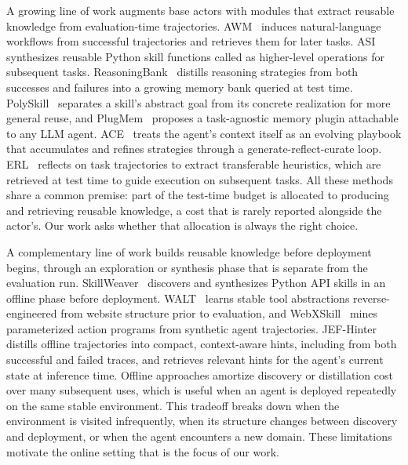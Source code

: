  A growing line of work augments base actors with modules that extract reusable knowledge from evaluation-time trajectories.
AWM~\citep{wang-etal-2024-agent} induces natural-language workflows from successful trajectories and retrieves them for later tasks.
ASI~\citep{wang-etal-2025-asi} synthesizes reusable Python skill functions called as higher-level operations for subsequent tasks.
ReasoningBank~\citep{ouyang-etal-2025-reasoningbank} distills reasoning strategies from both successes and failures into a growing memory bank queried at test time.
PolySkill~\citep{li-etal-2025-polyskill} separates a skill's abstract goal from its concrete realization for more general reuse, and PlugMem~\citep{yang-etal-2026-plugmem} proposes a task-agnostic memory plugin attachable to any LLM agent.
ACE~\citep{zhang-etal-2025-ace} treats the agent's context itself as an evolving playbook that accumulates and refines strategies through a generate-reflect-curate loop.
ERL~\citep{allard-etal-2026-erl} reflects on task trajectories to extract transferable heuristics, which are retrieved at test time to guide execution on subsequent tasks.
All these methods share a common premise: part of the test-time budget is allocated to producing and retrieving reusable knowledge, a cost that is rarely reported alongside the actor's.
Our work asks whether that allocation is always the right choice.

 A complementary line of work builds reusable knowledge before deployment begins, through an exploration or synthesis phase that is separate from the evaluation run.
SkillWeaver~\citep{zheng-etal-2025-skillweaver} discovers and synthesizes Python API skills in an offline phase before deployment.
WALT~\citep{prabhu-etal-2025-walt} learns stable tool abstractions reverse-engineered from website structure prior to evaluation, and
WebXSkill~\citep{wang-etal-2026-webxskill} mines parameterized action programs from synthetic agent trajectories.
JEF-Hinter~\citep{nekoei-etal-2025-jefhinter} distills offline trajectories into compact, context-aware hints, including from both successful and failed traces, and retrieves relevant hints for the agent's current state at inference time.
Offline approaches amortize discovery or distillation cost over many subsequent uses, which is useful when an agent is deployed repeatedly on the same stable environment.
This tradeoff breaks down when the environment is visited infrequently, when its structure changes between discovery and deployment, or when the agent encounters a new domain.
These limitations motivate the online setting that is the focus of our work.

